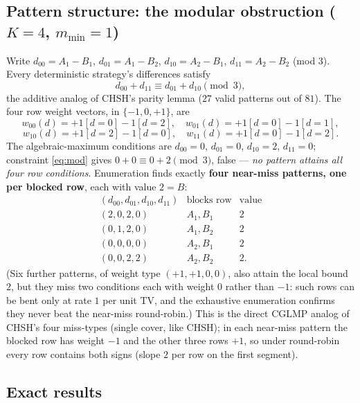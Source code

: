 \documentclass[aps,pra,reprint,superscriptaddress,floatfix]{revtex4-2}
\begin{document}
\subsection{Pattern structure: the modular obstruction ($K=4$,
$m_{\min}=1$)}

Write $d_{00}=A_{1}-B_{1}$, $d_{01}=A_{1}-B_{2}$, $d_{10}=A_{2}-B_{1}$,
$d_{11}=A_{2}-B_{2}$ (mod $3$). Every deterministic strategy's differences
satisfy
\begin{equation}
d_{00}+d_{11}\equiv d_{01}+d_{10}\pmod{3},
\label{eq:mod}
\end{equation}
the additive analog of {CHSH}'s parity lemma ($27$ valid patterns out of
$81$). The four row weight vectors, in $\{-1,0,+1\}$, are
\begin{equation*}
w_{00}(d)=+1[d{=}0]-1[d{=}2],\quad w_{01}(d)=+1[d{=}0]-1[d{=}1],
\end{equation*}
\begin{equation*}
w_{10}(d)=+1[d{=}2]-1[d{=}0],\quad w_{11}(d)=+1[d{=}0]-1[d{=}2].
\end{equation*}
The algebraic-maximum conditions are $d_{00}=0$, $d_{01}=0$, $d_{10}=2$,
$d_{11}=0$; constraint \eqref{eq:mod} gives $0+0\equiv 0+2\pmod 3$, false
--- \emph{no pattern attains all four row conditions}. Enumeration finds
exactly \textbf{four near-miss patterns, one per blocked row}, each with
value $2=B$:
\begin{equation*}
\begin{array}{ccl}
(d_{00},d_{01},d_{10},d_{11}) & \text{blocks row} & \text{value}\\[2pt]
(2,0,2,0) & A_{1},B_{1} & 2\\
(0,1,2,0) & A_{1},B_{2} & 2\\
(0,0,0,0) & A_{2},B_{1} & 2\\
(0,0,2,2) & A_{2},B_{2} & 2.
\end{array}
\end{equation*}
(Six further patterns, of weight type $(+1,+1,0,0)$, also attain the local
bound $2$, but they miss two conditions each with weight $0$ rather than
$-1$: such rows can be bent only at rate $1$ per unit TV, and the exhaustive
enumeration confirms they never beat the near-miss round-robin.) This is the
direct {CGLMP} analog of {CHSH}'s four miss-types (single cover, like
{CHSH}); in each near-miss pattern the blocked row has weight
$-1$ and the other three rows $+1$, so under round-robin every row
contains both signs (slope $2$ per row on the first segment).

\subsection{Exact results}
\end{document}

